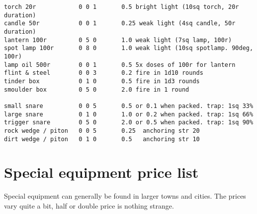 \begin{verbatim}
torch 20r            0 0 1       0.5 bright light (10sq torch, 20r duration)
candle 50r           0 0 1       0.25 weak light (4sq candle, 50r duration)
lantern 100r         0 5 0       1.0 weak light (7sq lamp, 100r)
spot lamp 100r       0 8 0       1.0 weak light (10sq spotlamp. 90deg, 100r)
lamp oil 500r        0 0 1       0.5 5x doses of 100r for lantern
flint & steel        0 0 3       0.2 fire in 1d10 rounds
tinder box           0 1 0       0.5 fire in 1d3 rounds
smoulder box         0 5 0       2.0 fire in 1 round

small snare          0 0 5       0.5 or 0.1 when packed. trap: 1sq 33%
large snare          0 1 0       1.0 or 0.2 when packed. trap: 1sq 66%
trigger snare        0 5 0       2.0 or 0.5 when packed. trap: 1sq 90%
rock wedge / piton   0 0 5       0.25  anchoring str 20
dirt wedge / piton   0 1 0       0.5   anchoring str 10
\end{verbatim}
\normalsize







\goodbreak {}
\section*{Special equipment price list}

Special equipment can generally be found in larger towns and cities.
The prices vary quite a bit, half or double price is nothing strange.


